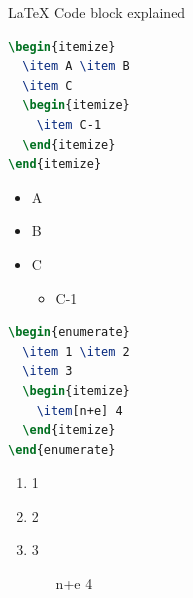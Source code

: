 \documentclass{beamer}
\begin{document}
\begin{frame}[fragile]{\LaTeX{} Code block explained}
    \begin{minipage}{0.5\linewidth}
\begin{lstlisting}[language=TeX]
\begin{itemize}
  \item A \item B
  \item C
  \begin{itemize}
    \item C-1
  \end{itemize}
\end{itemize}
\end{lstlisting}
    \end{minipage}\hspace{1cm}
    \begin{minipage}{0.3\linewidth}
        \begin{itemize}
            \item A
            \item B
            \item C
            \begin{itemize}
                \item C-1
            \end{itemize}
        \end{itemize}
    \end{minipage}
    \medskip
    \pause
    \begin{minipage}{0.5\linewidth}
\begin{lstlisting}[language=TeX]
\begin{enumerate}
  \item 1 \item 2
  \item 3
  \begin{itemize}
    \item[n+e] 4
  \end{itemize}
\end{enumerate}
\end{lstlisting}
    \end{minipage}\hspace{1cm}
    \begin{minipage}{0.3\linewidth}
        \begin{enumerate}
            \item 1
            \item 2
            \item 3
            \begin{itemize}
                \item[n+e] 4
            \end{itemize}
        \end{enumerate}
    \end{minipage}
\end{frame}
\end{document}
